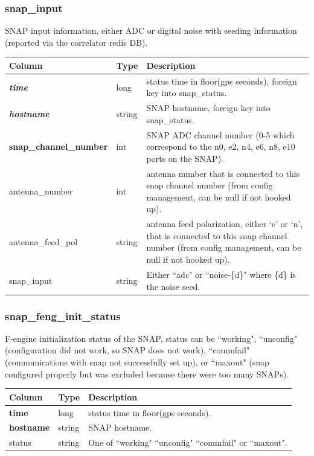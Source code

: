 \documentclass{article}
\begin{document}
{\subsubsection{snap\_input}
SNAP input information, either ADC or digital noise with seeding information (reported via the correlator redis DB).
\begin{center}
 \begin{tabular}{| p{4cm} | p{2cm} | p{10cm} |}
\hline
 {\bf Column} & {\bf Type}  & {\bf Description} \\ [0.5ex]  \hline\hline
\textbf{\textit{time}} & long & status time in floor(gps seconds), foreign key into snap\_status. \\ \hline
\textbf{\textit{hostname}} & string & SNAP hostname, foreign key into snap\_status. \\ \hline
\textbf{snap\_channel\_number} & int & SNAP ADC channel number (0-5 which correspond to the n0, e2, n4, e6, n8, e10 ports on the SNAP). \\ \hline
antenna\_number & int & antenna number that is connected to this snap channel number (from config management, can be null if not hooked up). \\ \hline
antenna\_feed\_pol & string & antenna feed polarization, either `e' or `n', that is connected to this snap channel number (from config management, can be null if not hooked up). \\ \hline
snap\_input & string & Either ``adc" or ``noise-\{d\}" where \{d\} is the noise seed. \\ \hline
\end{tabular}
\end{center}

\subsubsection{snap\_feng\_init\_status}
F-engine initialization status of the SNAP, status can be ``working", ``unconfig" (configuration did not work, so SNAP does not work), ``commfail" (communications with snap not successfully set up), or ``maxout" (snap configured properly but was excluded because there were too many SNAPs).
\begin{center}
 \begin{tabular}{| p{4cm} | p{2cm} | p{10cm} |}
\hline
 {\bf Column} & {\bf Type}  & {\bf Description} \\ [0.5ex]  \hline\hline
\textbf{time} & long & status time in floor(gps seconds). \\ \hline
\textbf{hostname} & string & SNAP hostname. \\ \hline
status & string & One of ``working"  ``unconfig" ``commfail" or ``maxout". \\ \hline
\end{tabular}
\end{center}

}
\end{document}
